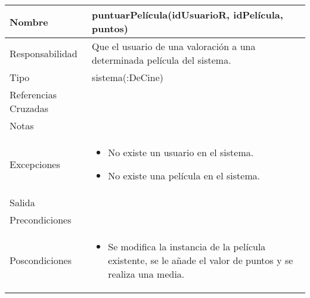 \documentclass{article}
\begin{document}
\begin{table}[h]
\begin{tabular}{|l|l|l|l|l|l|}
\hline
\multicolumn{2}{|p{3cm}|}{Nombre} & \multicolumn{4}{p{10cm}|}{\textbf{puntuarPelícula(idUsuarioR, idPelícula, puntos)}}\\
\hline
\multicolumn{2}{|p{3cm}|}{Responsabilidad} & \multicolumn{4}{p{10cm}|}{Que el usuario de una valoración a una determinada película del sistema.} \\
\hline
\multicolumn{2}{|p{3cm}|}{Tipo} & \multicolumn{4}{p{10cm}|}{sistema(:DeCine)} \\
\hline
\multicolumn{2}{|p{3cm}|}{Referencias Cruzadas} & \multicolumn{4}{p{10cm}|}{} \\
\hline
\multicolumn{2}{|p{3cm}|}{Notas} & \multicolumn{4}{p{10cm}|}{} \\
\hline
\multicolumn{2}{|p{3cm}|}{Excepciones} & \multicolumn{4}{p{10cm}|}{\begin{itemize}
\item No existe un usuario en el sistema.
\item No existe una película en el sistema.
\end{itemize}} \\
\hline
\multicolumn{2}{|p{3cm}|}{Salida} & \multicolumn{4}{p{10cm}|}{} \\
\hline
\multicolumn{2}{|p{3cm}|}{Precondiciones} & \multicolumn{4}{p{10cm}|}{} \\
\hline
\multicolumn{2}{|p{3cm}|}{Poscondiciones} & \multicolumn{4}{p{10cm}|}{\begin{itemize}
\item Se modifica la instancia de la película existente, se le añade el valor de puntos y se realiza una media.
\end{itemize}} \\
\hline
\end{tabular}
\end{table}
\end{document}
